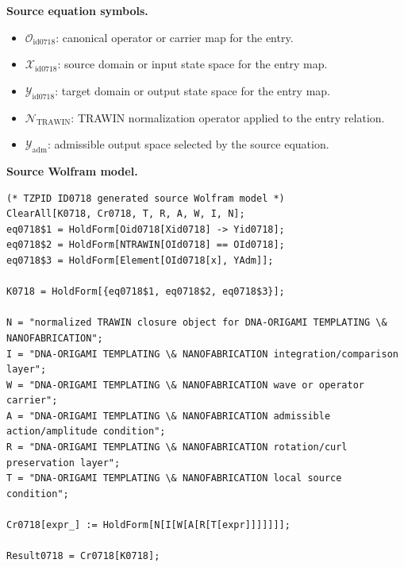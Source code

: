 \begin{minipage}[t]{0.49\linewidth}
\begingroup
\small
\raggedright
\textbf{Source equation symbols.}\par
\begin{itemize}[leftmargin=1.35em,itemsep=1pt,topsep=1pt,parsep=0pt]
    \item $\mathcal{O}_{\mathrm{id0718}}$: canonical operator or carrier map for the entry.
    \item $\mathcal{X}_{\mathrm{id0718}}$: source domain or input state space for the entry map.
    \item $\mathcal{Y}_{\mathrm{id0718}}$: target domain or output state space for the entry map.
    \item $\mathcal{N}_{\mathrm{TRAWIN}}$: TRAWIN normalization operator applied to the entry relation.
    \item $\mathcal{Y}_{\mathrm{adm}}$: admissible output space selected by the source equation.
\end{itemize}
\endgroup
\end{minipage}\hfill
\begin{minipage}[t]{0.47\linewidth}
\begingroup
\scriptsize
\raggedright
\textbf{Source Wolfram model.}\par
\begin{Verbatim}[fontsize=\tiny,breaklines=true,breakanywhere=true]
(* TZPID ID0718 generated source Wolfram model *)
ClearAll[K0718, Cr0718, T, R, A, W, I, N];
eq0718$1 = HoldForm[Oid0718[Xid0718] -> Yid0718];
eq0718$2 = HoldForm[NTRAWIN[OId0718] == OId0718];
eq0718$3 = HoldForm[Element[OId0718[x], YAdm]];

K0718 = HoldForm[{eq0718$1, eq0718$2, eq0718$3}];

N = "normalized TRAWIN closure object for DNA-ORIGAMI TEMPLATING \& NANOFABRICATION";
I = "DNA-ORIGAMI TEMPLATING \& NANOFABRICATION integration/comparison layer";
W = "DNA-ORIGAMI TEMPLATING \& NANOFABRICATION wave or operator carrier";
A = "DNA-ORIGAMI TEMPLATING \& NANOFABRICATION admissible action/amplitude condition";
R = "DNA-ORIGAMI TEMPLATING \& NANOFABRICATION rotation/curl preservation layer";
T = "DNA-ORIGAMI TEMPLATING \& NANOFABRICATION local source condition";

Cr0718[expr_] := HoldForm[N[I[W[A[R[T[expr]]]]]]];

Result0718 = Cr0718[K0718];
\end{Verbatim}
\endgroup
\end{minipage}

